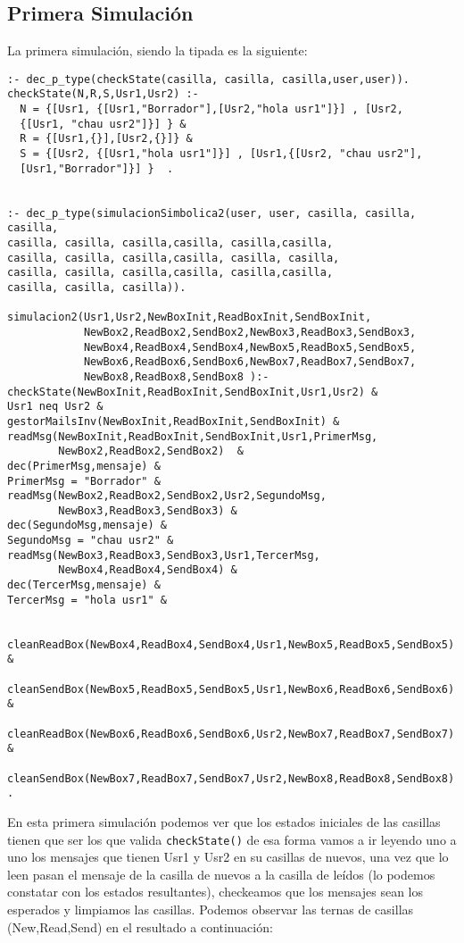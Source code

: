 \subsection{Primera Simulación}
La primera simulación, siendo la tipada es la siguiente: 
\begin{verbatim}
:- dec_p_type(checkState(casilla, casilla, casilla,user,user)).
checkState(N,R,S,Usr1,Usr2) :- 
  N = {[Usr1, {[Usr1,"Borrador"],[Usr2,"hola usr1"]}] , [Usr2,
  {[Usr1, "chau usr2"]}] } &
  R = {[Usr1,{}],[Usr2,{}]} &
  S = {[Usr2, {[Usr1,"hola usr1"]}] , [Usr1,{[Usr2, "chau usr2"],
  [Usr1,"Borrador"]}] }  .


:- dec_p_type(simulacionSimbolica2(user, user, casilla, casilla, casilla,
casilla, casilla, casilla,casilla, casilla,casilla,
casilla, casilla, casilla,casilla, casilla, casilla,
casilla, casilla, casilla,casilla, casilla,casilla,
casilla, casilla, casilla)).

simulacion2(Usr1,Usr2,NewBoxInit,ReadBoxInit,SendBoxInit,
            NewBox2,ReadBox2,SendBox2,NewBox3,ReadBox3,SendBox3,
            NewBox4,ReadBox4,SendBox4,NewBox5,ReadBox5,SendBox5,
            NewBox6,ReadBox6,SendBox6,NewBox7,ReadBox7,SendBox7,
            NewBox8,ReadBox8,SendBox8 ):-
checkState(NewBoxInit,ReadBoxInit,SendBoxInit,Usr1,Usr2) &
Usr1 neq Usr2 &
gestorMailsInv(NewBoxInit,ReadBoxInit,SendBoxInit) & 
readMsg(NewBoxInit,ReadBoxInit,SendBoxInit,Usr1,PrimerMsg,
        NewBox2,ReadBox2,SendBox2)  &
dec(PrimerMsg,mensaje) &
PrimerMsg = "Borrador" & 
readMsg(NewBox2,ReadBox2,SendBox2,Usr2,SegundoMsg,
        NewBox3,ReadBox3,SendBox3) &
dec(SegundoMsg,mensaje) & 
SegundoMsg = "chau usr2" &
readMsg(NewBox3,ReadBox3,SendBox3,Usr1,TercerMsg,
        NewBox4,ReadBox4,SendBox4) &
dec(TercerMsg,mensaje) &
TercerMsg = "hola usr1" &

 cleanReadBox(NewBox4,ReadBox4,SendBox4,Usr1,NewBox5,ReadBox5,SendBox5) &
 cleanSendBox(NewBox5,ReadBox5,SendBox5,Usr1,NewBox6,ReadBox6,SendBox6) &
 cleanReadBox(NewBox6,ReadBox6,SendBox6,Usr2,NewBox7,ReadBox7,SendBox7) &
 cleanSendBox(NewBox7,ReadBox7,SendBox7,Usr2,NewBox8,ReadBox8,SendBox8) .
\end{verbatim}
En esta primera simulación podemos ver que los estados iniciales de las casillas tienen que ser los que valida \verb|checkState()| de esa forma vamos a ir leyendo uno a uno los mensajes que tienen Usr1 y Usr2 en su casillas de nuevos, una vez que lo leen pasan el mensaje de la casilla de nuevos a la casilla de leídos (lo podemos constatar con los estados resultantes), checkeamos que los mensajes sean los esperados y limpiamos las casillas. Podemos observar las ternas de casillas (New,Read,Send) en el resultado a continuación:
